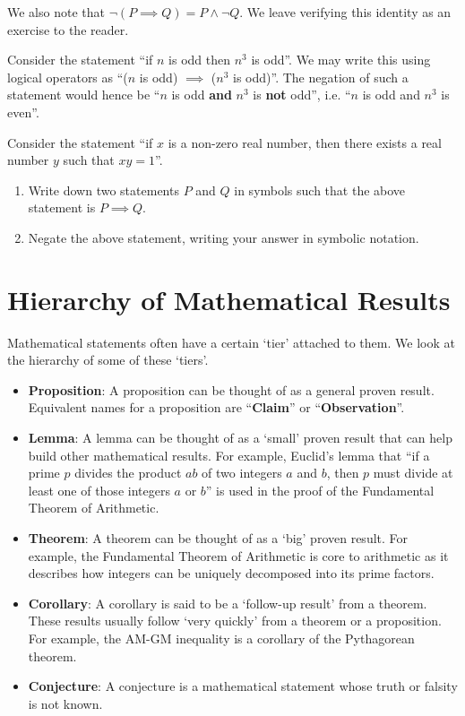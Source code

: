 We also note that $\lnot(P \implies Q) = P \land \lnot Q$. We leave verifying this identity as an exercise to the reader.

\begin{example}
    Consider the statement ``if $n$ is odd then $n^3$ is odd''. We may write this using logical operators as ``($n$ is odd) $\implies$ ($n^3$ is odd)''. The negation of such a statement would hence be ``$n$ is odd \textbf{and} $n^3$ is \textbf{not} odd'', i.e. ``$n$ is odd and $n^3$ is even''.
\end{example}

\newpage

\begin{exercise}
    Consider the statement ``if $x$ is a non-zero real number, then there exists a real number $y$ such that $xy = 1$''.
    \begin{enumerate}[label=(\roman*)]
        \item Write down two statements $P$ and $Q$ in symbols such that the above statement is $P \implies Q$.
        \item Negate the above statement, writing your answer in symbolic notation.
    \end{enumerate}
\end{exercise}

\section{Hierarchy of Mathematical Results}
Mathematical statements often have a certain `tier' attached to them. We look at the hierarchy of some of these `tiers'.
\begin{itemize}
    \item \textbf{Proposition}: A proposition can be thought of as a general proven result. Equivalent names for a proposition are ``\textbf{Claim}'' or ``\textbf{Observation}''.
    \item \textbf{Lemma}: A lemma can be thought of as a `small' proven result that can help build other mathematical results. For example, Euclid's lemma that ``if a prime $p$ divides the product $ab$ of two integers $a$ and $b$, then $p$ must divide at least one of those integers $a$ or $b$'' is used in the proof of the Fundamental Theorem of Arithmetic.
    \item \textbf{Theorem}: A theorem can be thought of as a `big' proven result. For example, the Fundamental Theorem of Arithmetic is core to arithmetic as it describes how integers can be uniquely decomposed into its prime factors.
    \item \textbf{Corollary}: A corollary is said to be a `follow-up result' from a theorem. These results usually follow `very quickly' from a theorem or a proposition. For example, the AM-GM inequality is a corollary of the Pythagorean theorem.
    \item \textbf{Conjecture}: A conjecture is a mathematical statement whose truth or falsity is not known.
\end{itemize}

